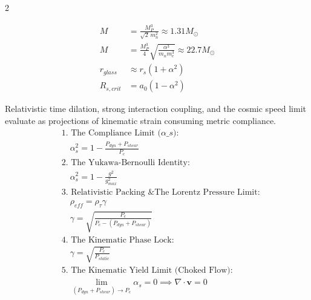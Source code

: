 \begin{multicols}{2}
\begin{tcolorbox}[cheatbox, title={\refstepcounter{cheatnum}\label{box:unified_deborah}\thecheatnum. The Cosmological Deborah Number \hfill\scriptsize\hyperref[sec:deriv_unified_deborah]{[Proof $\downarrow$]}}]
\begin{align}
    M &= \frac{M_P^3}{\sqrt{2}\, m_n^2} \approx 1.31 M_\odot \label{eq:chandra_mass_limit} \\ %
    M &= \frac{M_P^3}{4} \sqrt{ \frac{\alpha^3}{m_n m_e^3} } \approx 22.7 M_\odot \label{eq:astral_mass_limit} \\ %
    r_{glass} &\approx r_s (1 + \alpha^2) \label{eq:r_glass} \\
    R_{s,crit} &= a_0(1 - \alpha^2) \label{eq:terminal_radius}
\end{align}
\end{tcolorbox}

\begin{tcolorbox}[cheatbox, title={\refstepcounter{cheatnum}\label{box:viscoelastic_stiffening}\thecheatnum. Phase Stiffening \& Time Dilation \hfill\scriptsize\hyperref[sec:deriv_viscoelastic_stiffening]{[Proof $\downarrow$]}}]
Relativistic time dilation, strong interaction coupling, and the cosmic speed limit evaluate as projections of kinematic strain consuming metric compliance. 
\begin{align}
    &\text{1. The Compliance Limit ($\alpha\_s$):} \nonumber \\
    &\quad \alpha_s^2 = 1 - \frac{P_{dyn} + P_{shear}}{P_c} \label{eq:admittance_pressure_ratio} \\
    &\text{2. The Yukawa-Bernoulli Identity:} \nonumber \\
    &\quad \alpha_s^2 = 1 - \frac{g^2}{g_{max}^2} \label{eq:yukawa_identity} \\
    &\text{3. Relativistic Packing \& The Lorentz Pressure Limit:} \nonumber \\
    &\quad \rho_{eff} = \rho_{\tau} \gamma \label{eq:relativistic_packing_admittance} \\
    &\quad \gamma = \sqrt{\frac{P_c}{P_c - (P_{dyn} + P_{shear})}} \label{eq:lorentz_pressure} \\
    &\text{4. The Kinematic Phase Lock:} \nonumber \\
    &\quad \gamma = \sqrt{\frac{P_c}{P_{static}}} \label{eq:admittance_spin_identity} \\
    &\text{5. The Kinematic Yield Limit (Choked Flow):} \nonumber \\ 
    &\quad \lim_{(P_{dyn} + P_{shear}) \to P_c} \alpha_s = 0 \implies \nabla \cdot \mathbf{v} = 0 \label{eq:cavitation_collapse}
\end{align}
\end{tcolorbox}


\end{multicols}
